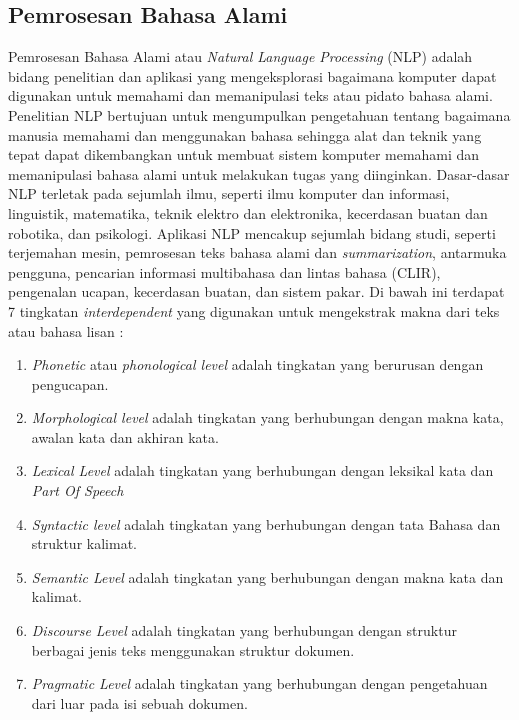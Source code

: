 \subsection{Pemrosesan Bahasa Alami}
Pemrosesan Bahasa Alami atau \textit{Natural Language Processing} (NLP) adalah 
bidang penelitian dan aplikasi yang mengeksplorasi bagaimana komputer 
dapat digunakan untuk memahami dan memanipulasi teks atau pidato bahasa 
alami. Penelitian NLP bertujuan untuk mengumpulkan pengetahuan tentang 
bagaimana manusia memahami dan menggunakan bahasa sehingga alat dan 
teknik yang tepat dapat dikembangkan untuk membuat sistem komputer 
memahami dan memanipulasi bahasa alami untuk melakukan tugas yang 
diinginkan. Dasar-dasar NLP terletak pada sejumlah ilmu, seperti ilmu 
komputer dan informasi, linguistik, matematika, teknik elektro dan 
elektronika, kecerdasan buatan dan robotika, dan psikologi. Aplikasi NLP 
mencakup sejumlah bidang studi, seperti terjemahan mesin, pemrosesan 
teks bahasa alami dan \textit{summarization}, antarmuka pengguna, 
pencarian informasi multibahasa dan lintas bahasa (CLIR), pengenalan 
ucapan, kecerdasan buatan, dan sistem pakar. Di bawah ini terdapat 7 
tingkatan \textit{interdependent} yang digunakan untuk mengekstrak 
makna dari teks atau bahasa lisan \cite{9}:
\begin{enumerate}[leftmargin=*]
	\item \textit{Phonetic} atau \textit{phonological level} adalah 
	tingkatan yang berurusan dengan pengucapan.
	\item \textit{Morphological level} adalah tingkatan yang berhubungan 
	dengan makna kata, awalan kata dan akhiran kata.
	\item \textit{Lexical Level} adalah tingkatan yang berhubungan dengan 
	leksikal kata dan \textit{Part Of Speech}
	\item \textit{Syntactic level} adalah tingkatan yang berhubungan 
	dengan tata Bahasa dan struktur kalimat.
	\item \textit{Semantic Level} adalah tingkatan yang berhubungan dengan 
	makna kata dan kalimat.
	\item \textit{Discourse Level} adalah tingkatan yang berhubungan 
	dengan struktur berbagai jenis teks menggunakan struktur dokumen.
	\item \textit{Pragmatic Level} adalah tingkatan yang berhubungan 
	dengan pengetahuan dari luar pada isi sebuah dokumen.
\end{enumerate}

